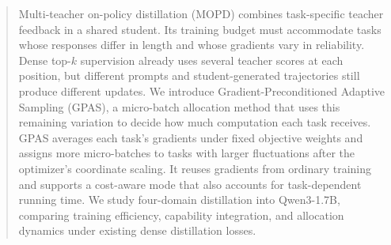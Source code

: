 \begin{abstract}
Multi-teacher on-policy distillation (MOPD) combines task-specific teacher
feedback in a shared student. Its training budget must accommodate tasks
whose responses differ in length and whose gradients vary in reliability.
Dense top-$k$ supervision already uses several teacher scores at each
position, but different prompts and student-generated trajectories still
produce different updates. We introduce Gradient-Preconditioned Adaptive
Sampling (GPAS), a micro-batch allocation method that uses this remaining
variation to decide how much computation each task receives. GPAS averages
each task's gradients under fixed objective weights and assigns more
micro-batches to tasks with larger fluctuations after the optimizer's
coordinate scaling. It reuses gradients from ordinary training and supports
a cost-aware mode that also accounts for task-dependent running time.
We study four-domain distillation into Qwen3-1.7B, comparing training
efficiency, capability integration, and allocation dynamics under existing
dense distillation losses.
\end{abstract}
